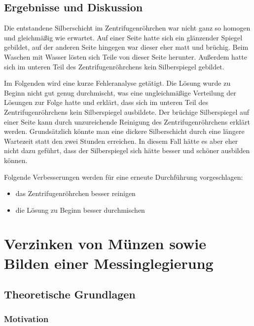 \documentclass{article}
\begin{document}
    \subsection{Ergebnisse und Diskussion}
      
      Die entstandene Silberschicht im Zentrifugenröhrchen war nicht ganz so homogen und gleichmäßig wie erwartet. Auf einer Seite hatte sich ein glänzender Spiegel gebildet, auf der anderen Seite hingegen war dieser eher matt und brüchig. Beim Waschen mit Wasser lösten sich Teile von dieser Seite herunter. Außerdem hatte sich im unteren Teil des Zentrifugenröhrchens kein Silberspiegel gebildet. 
      
      Im Folgenden wird eine kurze Fehleranalyse getätigt. Die Lösung wurde zu Beginn nicht gut genug durchmischt, was eine ungleichmäßige Verteilung der Lösungen zur Folge hatte und erklärt, dass sich im unteren Teil des Zentrifugenröhrchens kein Silberspiegel ausbildete. Der brüchige Silberspiegel auf einer Seite kann durch unzureichende Reinigung des Zentrifugenröhrchens erklärt werden. Grundsätzlich könnte man eine dickere Silberschicht durch eine längere Wartezeit statt den zwei Stunden erreichen. In diesem Fall hätte es aber eher nicht dazu geführt, dass der Silberspiegel sich hätte besser und schöner ausbilden können. 
      
      Folgende Verbesserungen werden für eine erneute Durchführung vorgeschlagen:
      
      \begin{itemize}
        \item das Zentrifugenröhrchen besser reinigen
        \item die Lösung zu Beginn besser durchmischen
      \end{itemize}
  
  \pagebreak
  
  \section{Verzinken von Münzen sowie Bilden einer Messinglegierung}
  
    \subsection{Theoretische Grundlagen}
      
      \subsubsection{Motivation}
        
\end{document}
